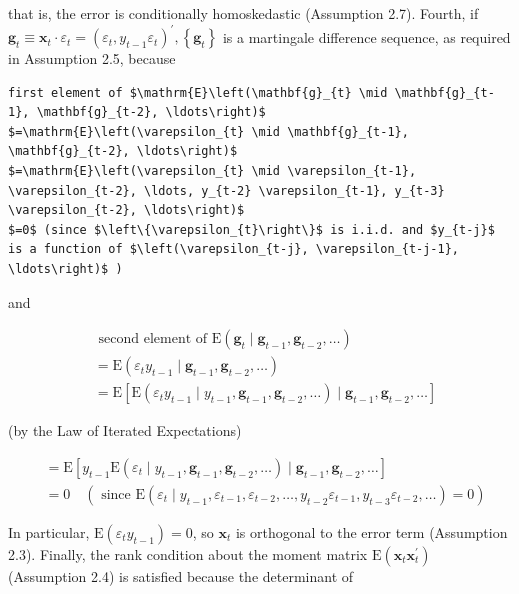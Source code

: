 \documentclass[10pt]{article}
\begin{document}
that is, the error is conditionally homoskedastic (Assumption 2.7). Fourth, if $\mathbf{g}_{t} \equiv \mathbf{x}_{t} \cdot \varepsilon_{t}=\left(\varepsilon_{t}, y_{t-1} \varepsilon_{t}\right)^{\prime},\left\{\mathbf{g}_{t}\right\}$ is a martingale difference sequence, as required in Assumption 2.5, because

\begin{verbatim}
first element of $\mathrm{E}\left(\mathbf{g}_{t} \mid \mathbf{g}_{t-1}, \mathbf{g}_{t-2}, \ldots\right)$
$=\mathrm{E}\left(\varepsilon_{t} \mid \mathbf{g}_{t-1}, \mathbf{g}_{t-2}, \ldots\right)$
$=\mathrm{E}\left(\varepsilon_{t} \mid \varepsilon_{t-1}, \varepsilon_{t-2}, \ldots, y_{t-2} \varepsilon_{t-1}, y_{t-3} \varepsilon_{t-2}, \ldots\right)$
$=0$ (since $\left\{\varepsilon_{t}\right\}$ is i.i.d. and $y_{t-j}$ is a function of $\left(\varepsilon_{t-j}, \varepsilon_{t-j-1}, \ldots\right)$ )
\end{verbatim}

and

$$
\begin{aligned}
& \text { second element of } \mathrm{E}\left(\mathbf{g}_{t} \mid \mathbf{g}_{t-1}, \mathbf{g}_{t-2}, \ldots\right) \\
& =\mathrm{E}\left(\varepsilon_{t} y_{t-1} \mid \mathbf{g}_{t-1}, \mathbf{g}_{t-2}, \ldots\right) \\
& =\mathrm{E}\left[\mathrm{E}\left(\varepsilon_{t} y_{t-1} \mid y_{t-1}, \mathbf{g}_{t-1}, \mathbf{g}_{t-2}, \ldots\right) \mid \mathbf{g}_{t-1}, \mathbf{g}_{t-2}, \ldots\right]
\end{aligned}
$$

(by the Law of Iterated Expectations)


\begin{align*}
& =\mathrm{E}\left[y_{t-1} \mathrm{E}\left(\varepsilon_{t} \mid y_{t-1}, \mathbf{g}_{t-1}, \mathbf{g}_{t-2}, \ldots\right) \mid \mathbf{g}_{t-1}, \mathbf{g}_{t-2}, \ldots\right] \\
& =0 \quad\left(\text { since } \mathrm{E}\left(\varepsilon_{t} \mid y_{t-1}, \varepsilon_{t-1}, \varepsilon_{t-2}, \ldots, y_{t-2} \varepsilon_{t-1}, y_{t-3} \varepsilon_{t-2}, \ldots\right)=0\right) \tag{6.4.3}
\end{align*}


In particular, $\mathrm{E}\left(\varepsilon_{t} y_{t-1}\right)=0$, so $\mathbf{x}_{t}$ is orthogonal to the error term (Assumption 2.3). Finally, the rank condition about the moment matrix $\mathrm{E}\left(\mathbf{x}_{t} \mathbf{x}_{t}^{\prime}\right)$ (Assumption 2.4) is satisfied because the determinant of
\end{document}
